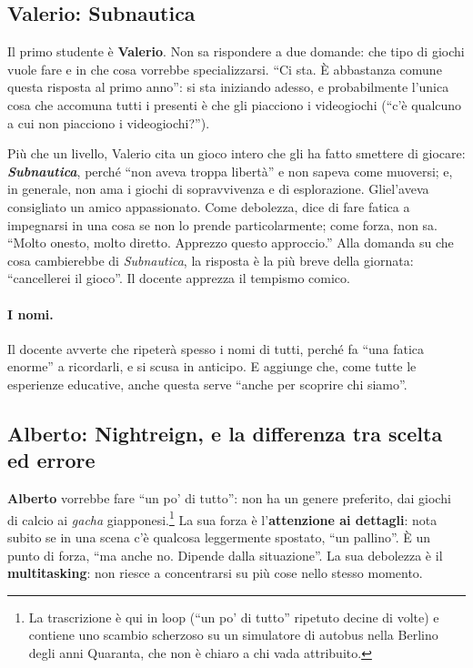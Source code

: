 \subsection{Valerio: Subnautica}

Il primo studente è \textbf{Valerio}. Non sa rispondere a due domande: che
tipo di giochi vuole fare e in che cosa vorrebbe specializzarsi. ``Ci sta. È
abbastanza comune questa risposta al primo anno'': si sta iniziando adesso, e
probabilmente l'unica cosa che accomuna tutti i presenti è che gli piacciono i
videogiochi (``c'è qualcuno a cui non piacciono i videogiochi?'').

Più che un livello, Valerio cita un gioco intero che gli ha fatto smettere di
giocare: \textbf{\emph{Subnautica}}, perché ``non aveva troppa libertà'' e non
sapeva come muoversi; e, in generale, non ama i giochi di sopravvivenza e di
esplorazione. Gliel'aveva consigliato un amico appassionato. Come debolezza,
dice di fare fatica a impegnarsi in una cosa se non lo prende
particolarmente; come forza, non sa. ``Molto onesto, molto diretto. Apprezzo
questo approccio.'' Alla domanda su che cosa cambierebbe di \emph{Subnautica},
la risposta è la più breve della giornata: ``cancellerei il gioco''. Il
docente apprezza il tempismo comico.

\paragraph{I nomi.} Il docente avverte che ripeterà spesso i nomi di tutti,
perché fa ``una fatica enorme'' a ricordarli, e si scusa in anticipo. E
aggiunge che, come tutte le esperienze educative, anche questa serve
``anche per scoprire chi siamo''.

\subsection{Alberto: Nightreign, e la differenza tra scelta ed errore}

\textbf{Alberto} vorrebbe fare ``un po' di tutto'': non ha un genere
preferito, dai giochi di calcio ai \emph{gacha} giapponesi.\footnote{La
trascrizione è qui in loop (``un po' di tutto'' ripetuto decine di volte) e
contiene uno scambio scherzoso su un simulatore di autobus nella Berlino degli
anni Quaranta, che non è chiaro a chi vada attribuito.} La sua forza è
l'\textbf{attenzione ai dettagli}: nota subito se in una scena c'è qualcosa
leggermente spostato, ``un pallino''. È un punto di forza, ``ma anche no.
Dipende dalla situazione''. La sua debolezza è il \textbf{multitasking}: non
riesce a concentrarsi su più cose nello stesso momento.

